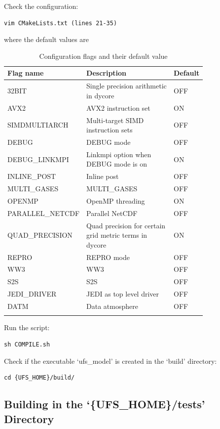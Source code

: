 \documentclass[11pt,fleqn]{report}              %
\begin{document}
Check the configuration:
\lstset{language=bash}   
\begin{lstlisting}[frame=trBL]
vim CMakeLists.txt (lines 21-35)
\end{lstlisting}
where the default values are
{
\fontsize{10}{12}\selectfont
\begin{longtable}{ p{0.22\linewidth} | p{0.5\linewidth} | p{0.08\linewidth} }
\hline
\hline
 Flag name & Description & Default \\
\hline
 32BIT & Single precision arithmetic in dycore & OFF \\
 AVX2 & AVX2 instruction set & ON \\
 SIMDMULTIARCH & Multi-target SIMD instruction sets & OFF \\
 DEBUG & DEBUG mode & OFF \\
 DEBUG\_LINKMPI & Linkmpi option when DEBUG mode is on & ON \\
 INLINE\_POST & Inline post & OFF \\
 MULTI\_GASES & MULTI\_GASES & OFF \\
 OPENMP & OpenMP threading & ON \\
 PARALLEL\_NETCDF & Parallel NetCDF & OFF \\
 QUAD\_PRECISION & Quad precision for certain grid metric terms in dycore & ON \\
 REPRO & REPRO mode & OFF \\
 WW3 & WW3 & OFF \\
 S2S & S2S & OFF \\
 JEDI\_DRIVER & JEDI as top level driver & OFF \\
 DATM & Data atmosphere & OFF \\
\hline
\caption{Configuration flags and their default value}
\label{table:ufs_weather_config_default}
\end{longtable}
}

Run the script:
\lstset{language=bash}   
\begin{lstlisting}[frame=trBL]
sh COMPILE.sh
\end{lstlisting}

\vspace{0.3cm}

Check if the executable `ufs\_model' is created in the `build' directory:
\lstset{language=bash}   
\begin{lstlisting}[frame=trBL]
cd {UFS_HOME}/build/
\end{lstlisting}


\subsection{Building in the `\{UFS\_HOME\}/tests' Directory}
\end{document}
